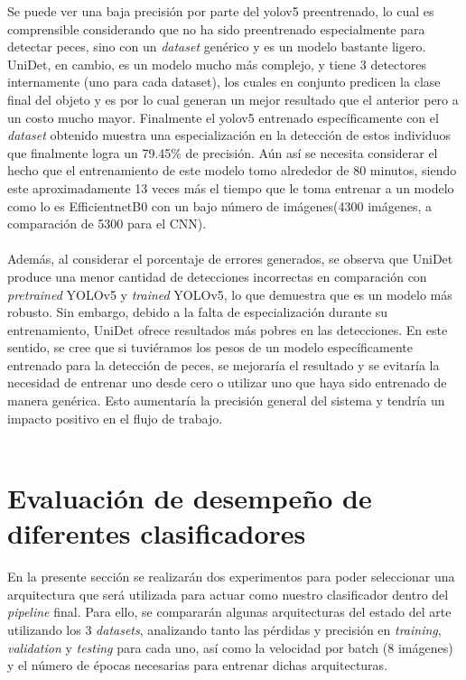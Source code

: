 Se puede ver una baja precisión por parte del yolov5 preentrenado, lo cual es comprensible considerando que no ha sido preentrenado especialmente para detectar peces, sino con un \textit{dataset} genérico y es un modelo bastante ligero. UniDet, en cambio, es un modelo mucho más complejo, y tiene 3 detectores internamente (uno para cada dataset), los cuales en conjunto predicen la clase final del objeto y es por lo cual generan un mejor resultado que el anterior pero a un costo mucho mayor. Finalmente el yolov5 entrenado específicamente con el \textit{dataset} obtenido muestra una especialización en la detección de estos individuos que finalmente logra un 79.45\% de precisión. Aún así se necesita considerar el hecho que el entrenamiento de este modelo tomo alrededor de 80 minutos, siendo este aproximadamente 13 veces más el tiempo que le toma entrenar a un modelo como lo es EfficientnetB0 con un bajo número de imágenes(4300 imágenes, a comparación de 5300 para el CNN).
\\\\

Además, al considerar el porcentaje de errores generados, se observa que UniDet produce una menor cantidad de detecciones incorrectas en comparación con \textit{pretrained} YOLOv5 y \textit{trained} YOLOv5, lo que demuestra que es un modelo más robusto. Sin embargo, debido a la falta de especialización durante su entrenamiento, UniDet ofrece resultados más pobres en las detecciones. En este sentido, se cree que si tuviéramos los pesos de un modelo específicamente entrenado para la detección de peces, se mejoraría el resultado y se evitaría la necesidad de entrenar uno desde cero o utilizar uno que haya sido entrenado de manera genérica. Esto aumentaría la precisión general del sistema y tendría un impacto positivo en el flujo de trabajo.
\\\\

\section{Evaluación de desempeño de diferentes clasificadores}
En la presente sección se realizarán dos experimentos para poder seleccionar una arquitectura que será utilizada para actuar como nuestro clasificador dentro del \textit{pipeline} final. Para ello, se compararán algunas arquitecturas del estado del arte utilizando los 3 \textit{datasets}, analizando tanto las pérdidas y precisión en \textit{training}, \textit{validation} y \textit{testing} para cada uno, así como la velocidad por batch (8 imágenes) y el número de épocas necesarias para entrenar dichas arquitecturas. 
